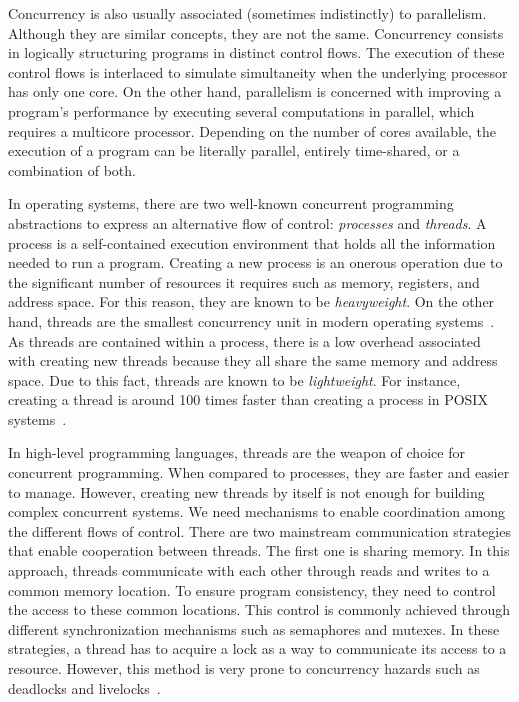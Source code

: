 Concurrency is also usually associated (sometimes indistinctly) to parallelism. Although they are similar concepts, they are not the same. Concurrency consists in logically structuring programs in distinct control flows. The execution of these control flows is interlaced to simulate simultaneity when the underlying processor has only one core. On the other hand, parallelism is concerned with improving a program's performance by executing several computations in parallel, which requires a multicore processor. Depending on the number of cores available, the execution of a program can be literally parallel, entirely time-shared, or a combination of both.

In operating systems, there are two well-known concurrent programming abstractions to express an alternative flow of control: \emph{processes} and \emph{threads}. A process is a self-contained execution environment that holds all the information needed to run a program. Creating a new process is an onerous operation due to the significant number of resources it requires such as memory, registers, and address space. For this reason, they are known to be \emph{heavyweight}. On the other hand, threads are the smallest concurrency unit in modern operating systems~\cite{tanenbaum:2007}. As threads are contained within a process, there is a low overhead associated with creating new threads because they all share the same memory and address space. Due to this fact, threads are known to be \emph{lightweight}. For instance, creating a thread is around 100 times faster than creating a process in POSIX systems~\cite{butenhof:1997}.

In high-level programming languages, threads are the weapon of choice for concurrent programming. When compared to processes, they are faster and easier to manage. However, creating new threads by itself is not enough for building complex concurrent systems. We need mechanisms to enable coordination among the different flows of control. There are two mainstream communication strategies that enable cooperation between threads. The first one is sharing memory. In this approach, threads communicate with each other through reads and writes to a common memory location. To ensure program consistency, they need to control the access to these common locations. This control is commonly achieved through different synchronization mechanisms such as semaphores and mutexes. In these strategies, a thread has to acquire a lock as a way to communicate its access to a resource. However, this method is very prone to concurrency hazards such as deadlocks and livelocks~\cite{herlihy:2012}.

